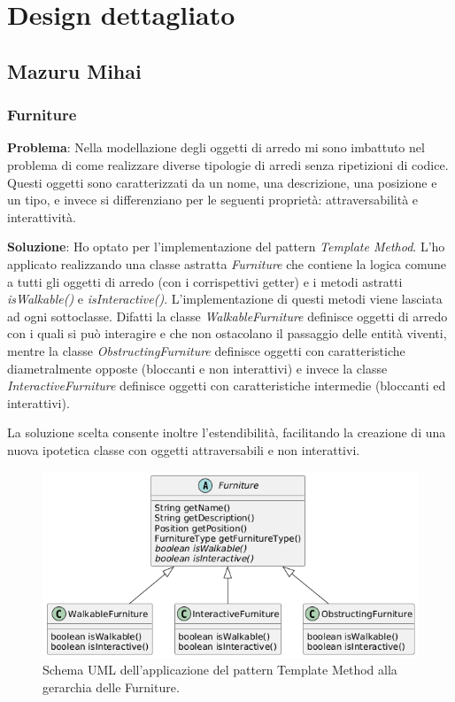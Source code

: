 \documentclass[a4paper,12pt]{report}
\begin{document}
\section{Design dettagliato}

\subsection{Mazuru Mihai}

\subsubsection{Furniture}
\textbf{Problema}: Nella modellazione degli oggetti di arredo mi sono imbattuto nel problema 
di come realizzare diverse tipologie di arredi senza ripetizioni di codice. Questi oggetti 
sono caratterizzati da un nome, una descrizione, una posizione e un tipo, e invece si differenziano 
per le seguenti proprietà: attraversabilità e interattività.

\textbf{Soluzione}: Ho optato per l'implementazione del pattern \textit{Template Method}. 
L'ho applicato realizzando una classe astratta \textit{Furniture} che contiene la logica comune a 
tutti gli oggetti di arredo (con i corrispettivi getter) e i metodi astratti \textit{isWalkable()} e 
\textit{isInteractive()}. L'implementazione di questi metodi viene lasciata ad ogni sottoclasse.
Difatti la classe \textit{WalkableFurniture} definisce oggetti di arredo con i quali si può interagire e
che non ostacolano il passaggio delle entità viventi, mentre la classe \textit{ObstructingFurniture} 
definisce oggetti con caratteristiche diametralmente opposte (bloccanti e non interattivi) e 
invece la classe \textit{InteractiveFurniture} definisce oggetti con caratteristiche intermedie (bloccanti ed interattivi).

\newline La soluzione scelta consente inoltre l'estendibilità, facilitando la creazione di una nuova
ipotetica classe con oggetti attraversabili e non interattivi.

\begin{figure}[H]
	\centering{}
	\includegraphics[width=\textwidth]{img/template.png}
	\caption{Schema UML dell'applicazione del pattern Template Method alla gerarchia delle Furniture.}
	\label{img:template}
\end{figure}
\end{document}
